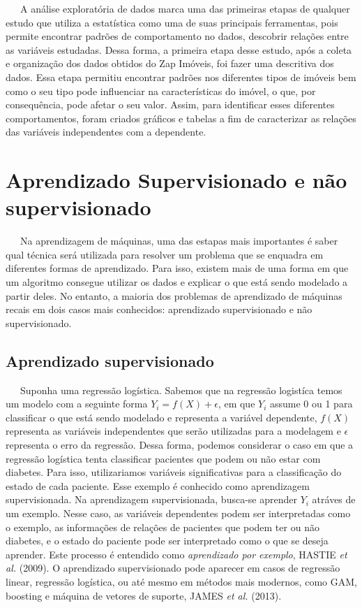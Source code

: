 \documentclass[
  12pt,
  letterpaper,
  DIV=11,
  numbers=noendperiod]{scrreprt}
\begin{document}
~~~A análise exploratória de dados marca uma das primeiras etapas de
qualquer estudo que utiliza a estatística como uma de suas principais
ferramentas, pois permite encontrar padrões de comportamento no dados,
descobrir relações entre as variáveis estudadas. Dessa forma, a primeira
etapa desse estudo, após a coleta e organização dos dados obtidos do Zap
Imóveis, foi fazer uma descritiva dos dados. Essa etapa permitiu
encontrar padrões nos diferentes tipos de imóveis bem como o seu tipo
pode influenciar na características do imóvel, o que, por consequência,
pode afetar o seu valor. Assim, para identificar esses diferentes
comportamentos, foram criados gráficos e tabelas a fim de caracterizar
as relações das variáveis independentes com a dependente.

\section{Aprendizado Supervisionado e não
supervisionado}\label{aprendizado-supervisionado-e-nuxe3o-supervisionado}

~~~Na aprendizagem de máquinas, uma das estapas mais importantes é saber
qual técnica será utilizada para resolver um problema que se enquadra em
diferentes formas de aprendizado. Para isso, existem mais de uma forma
em que um algoritmo consegue utilizar os dados e explicar o que está
sendo modelado a partir deles. No entanto, a maioria dos problemas de
aprendizado de máquinas recais em dois casos mais conhecidos:
aprendizado supervisionado e não supervisionado.

\subsection{Aprendizado
supervisionado}\label{aprendizado-supervisionado}

~~~Suponha uma regressão logística. Sabemos que na regressão logistíca
temos um modelo com a seguinte forma
\(Y_i = f\left(X\right) + \epsilon\), em que \(Y_i\) assume 0 ou 1 para
classificar o que está sendo modelado e representa a variável
dependente, \(f\left(X\right)\) representa as variáveis independentes
que serão utilizadas para a modelagem e \(\epsilon\) representa o erro
da regressão. Dessa forma, podemos considerar o caso em que a regressão
logística tenta classificar pacientes que podem ou não estar com
diabetes. Para isso, utilizariamos variáveis significativas para a
classificação do estado de cada paciente. Esse exemplo é conhecido como
aprendizagem supervisionada. Na aprendizagem supervisionada, busca-se
aprender \(Y_i\) atráves de um exemplo. Nesse caso, as variáveis
dependentes podem ser interpretadas como o exemplo, as informações de
relações de pacientes que podem ter ou não diabetes, e o estado do
paciente pode ser interpretado como o que se deseja aprender. Este
processo é entendido como \emph{aprendizado por exemplo}, HASTIE
\emph{et al.} (2009). O aprendizado supervisionado pode aparecer em
casos de regressão linear, regressão logística, ou até mesmo em métodos
mais modernos, como GAM, boosting e máquina de vetores de suporte, JAMES
\emph{et al.} (2013).
\end{document}
